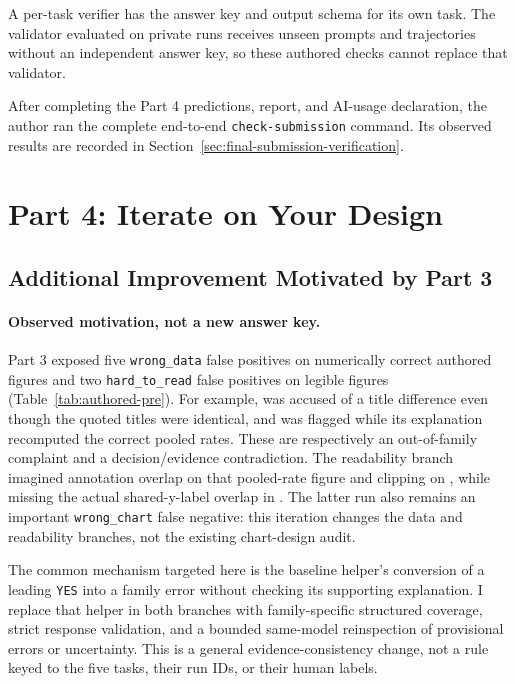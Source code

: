 \documentclass[11pt]{article}
\begin{document}
A per-task verifier has the answer key and output schema for its own
task. The validator evaluated on private runs receives unseen prompts
and trajectories without an independent answer key, so these authored
checks cannot replace that validator.

After completing the Part 4 predictions, report, and AI-usage declaration,
the author ran the complete end-to-end \texttt{check-submission} command.
Its observed results are recorded in
Section~\ref{sec:final-submission-verification}.

\section{Part 4: Iterate on Your Design}

\subsection{Additional Improvement Motivated by Part 3}

\paragraph{Observed motivation, not a new answer key.}
Part 3 exposed five \texttt{wrong\_data} false positives on numerically
correct authored figures and two \texttt{hard\_to\_read} false positives
on legible figures (Table~\ref{tab:authored-pre}).
For example,  was accused of a
title difference even though the quoted titles were identical, and
 was flagged while its explanation
recomputed the correct pooled rates. These are respectively an
out-of-family complaint and a decision/evidence contradiction.
The readability branch imagined annotation overlap on that pooled-rate
figure and clipping on , while missing
the actual shared-y-label overlap in
.
The latter run also remains an important \texttt{wrong\_chart} false
negative: this iteration changes the data and readability branches, not
the existing chart-design audit.

The common mechanism targeted here is the baseline helper's conversion
of a leading \texttt{YES} into a family error without checking its
supporting explanation. I replace that helper in both branches with
family-specific structured coverage, strict response validation, and a
bounded same-model reinspection of provisional errors or uncertainty.
This is a general evidence-consistency change, not a rule keyed to the
five tasks, their run IDs, or their human labels.
\end{document}
